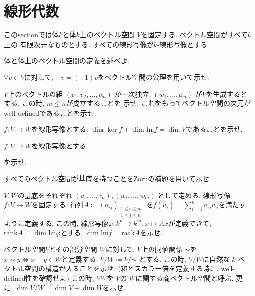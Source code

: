 \documentclass[lualatex]{exam}
\theoremstyle{remark}
\theoremstyle{plain}
\begin{document}
\section{線形代数}
このsectionでは体$k$と体$k$上のベクトル空間 $V$を固定する. ベクトル空間がすべて$k$上の
有限次元なものとする. すべての線形写像が$k$-線形写像とする. 
\begin{questions}

  \question 体と体上のベクトル空間の定義を述べよ.

  \question $\forall v \in V$に対して, $-v = (-1)v$をベクトル空間の公理を用いて示せ.
  
  \question $V$上のベクトルの組 $\left( v_1, v_2, \ldots, v_m \right) $ が一次独立, 
  $\left( w_1, \ldots ,w_n \right) $ が$V$を生成するとする. この時,  $m \leq n$が成立することを
  示せ. これをもってベクトル空間の次元がwell-definedであることを示せ.
  
  \question $f:V \to W$を線形写像とする. $\dim \ker f + \dim \mathrm{Im} f= \dim V$であることを示せ. 
  
  \question $f:V\to W$を線形写像とする. 
  を示せ. 
  
  \question すべてのベクトル空間が基底を持つことをZornの補題を用いて示せ.
  
  \question $V,W$の基底をそれぞれ $\left( v_1,\ldots,v_n \right), \left( w_1, \ldots ,w_m \right)  $ として定める. 
  線形写像$f:V \to W$を固定する. 行列$A \coloneqq \left( a_{ij} \right)_{\substack{1\leq i \leq m \\  1 \leq j \leq n}} $ を$f(v_j) = \sum_{i=1}^{n} a_{ij} w_i$を満たすように定義する. 
  この時, 線形写像$\varphi : k^n \to k^m, x \mapsto Ax $が定義できて, $\mathrm{rank} A \coloneqq \dim \mathrm{Im}\varphi  $とする. 
  $\dim \mathrm{Im}f = \mathrm{rank}A$を示せ.

  \question ベクトル空間$V$とその部分空間 $W$に対して, 
  $V$上の同値関係 $\sim $を $x \sim y \iff x - y \in W$と定義する. $V  /\mathord{W} \coloneqq V/ \mathord{\sim}$ 
   とする. この時, $V /W$に自然な $k$-ベクトル空間の構造が入ることを示せ. 
   (和とスカラー倍を定義する時に, well-defined性を確認せよ) この時, $V \mathord{W} $を $V$の
   $W$に関する商ベクトル空間と呼ぶ.
   更に,  $\dim V/ \mathord{W} = \dim V - \dim W$を示せ.
   

\end{questions}
\end{document}
